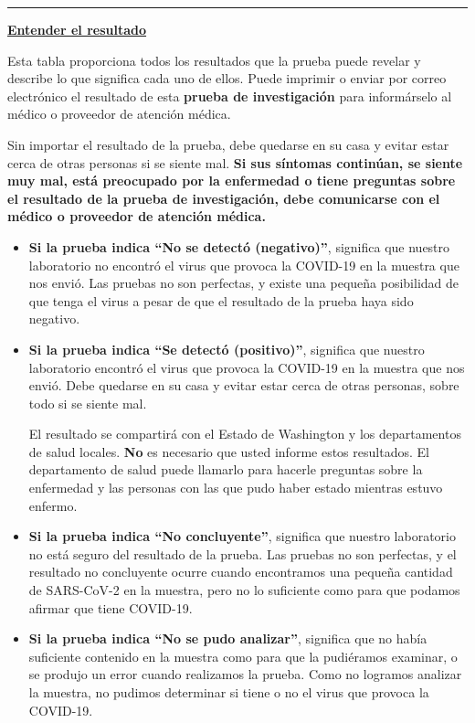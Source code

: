 \documentclass[10pt]{article}
\newcommand{\PageLine}{\rule{\textwidth}{0.25mm}}
\begin{document}
\PageLine
\bigskip

\large \underline{\textbf{Entender el resultado}}

Esta tabla proporciona todos los resultados que la prueba puede revelar y
describe lo que significa cada uno de ellos. Puede imprimir o enviar por correo
electrónico el resultado de esta \textbf{prueba de investigación} para
informárselo al médico o proveedor de atención médica.

Sin importar el resultado de la prueba, debe quedarse en su casa y evitar estar
cerca de otras personas si se siente mal. \textbf{Si sus síntomas continúan, se
siente muy mal, está preocupado por la enfermedad o tiene preguntas sobre el
resultado de la prueba de investigación, debe comunicarse con el médico o
proveedor de atención médica.}

\begin{itemize}


\item

  \textbf{Si la prueba indica ``No se detectó (negativo)''}, significa que nuestro
  laboratorio no encontró el virus que provoca la COVID-19 en la muestra que nos
  envió. Las pruebas no son perfectas, y existe una pequeña posibilidad de que
  tenga el virus a pesar de que el resultado de la prueba haya sido negativo.


\item

  \textbf{Si la prueba indica ``Se detectó (positivo)''}, significa que nuestro
  laboratorio encontró el virus que provoca la COVID-19 en la muestra que nos
  envió. Debe quedarse en su casa y evitar estar cerca de otras personas, sobre
  todo si se siente mal.

  El resultado se compartirá con el Estado de Washington y los departamentos de
  salud locales. \textbf{No} es necesario que usted informe estos resultados. El
  departamento de salud puede llamarlo para hacerle preguntas sobre la
  enfermedad y las personas con las que pudo haber estado mientras estuvo
  enfermo.


\item

  \textbf{Si la prueba indica ``No concluyente''}, significa que nuestro
  laboratorio no está seguro del resultado de la prueba. Las pruebas no son
  perfectas, y el resultado no concluyente ocurre cuando encontramos una pequeña
  cantidad de SARS-CoV-2 en la muestra, pero no lo suficiente como para que
  podamos afirmar que tiene COVID-19.


\item

  \textbf{Si la prueba indica ``No se pudo analizar''}, significa que no había
  suficiente contenido en la muestra como para que la pudiéramos examinar, o se
  produjo un error cuando realizamos la prueba. Como no logramos analizar la
  muestra, no pudimos determinar si tiene o no el virus que provoca la COVID-19.


\end{itemize}
\end{document}
